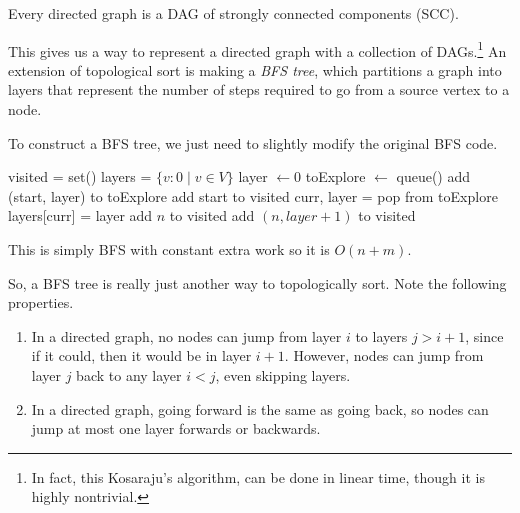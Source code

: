   \begin{theorem}
    Every directed graph is a DAG of strongly connected components (SCC). 
  \end{theorem}

  This gives us a way to represent a directed graph with a collection of DAGs.\footnote{In fact, this Kosaraju's algorithm, can be done in linear time, though it is highly nontrivial.} An extension of topological sort is making a \textit{BFS tree}, which partitions a graph into layers that represent the number of steps required to go from a source vertex to a node. 

  \begin{algo}
    To construct a BFS tree, we just need to slightly modify the original BFS code.
    \begin{algorithm}[H]
      \label{alg:bfs_tree}
      \begin{algorithmic}[1]
        \State visited = set() 
        \State layers = $\{v : 0 \mid v \in V \}$
          \State layer $\gets 0$ 
          \State toExplore $\gets$ queue() 
          \State add (start, layer) to toExplore 
          \State add start to visited
            \State curr, layer = pop from toExplore 
            \State layers[curr] = layer 
                \State add $n$ to visited 
                \State add $(n, layer+1)$ to visited 
              \EndIf
            \EndFor
          \EndWhile 
        \EndFunction
      \end{algorithmic}
    \end{algorithm}
    This is simply BFS with constant extra work so it is $O(n + m)$. 
  \end{algo}

  So, a BFS tree is really just another way to topologically sort. Note the following properties. 
  \begin{enumerate}
    \item In a directed graph, no nodes can jump from layer $i$ to layers $j > i+1$, since if it could, then it would be in layer $i+1$. However, nodes can jump from layer $j$ back to any layer $i < j$, even skipping layers. 
    \item In a directed graph, going forward is the same as going back, so nodes can jump at most one layer forwards or backwards. 
  \end{enumerate}



